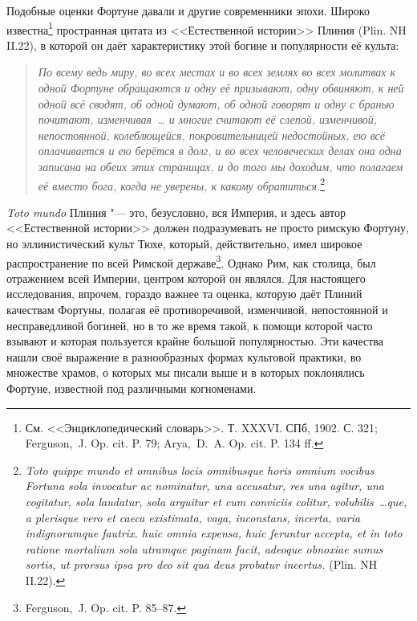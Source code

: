 Подобные оценки Фортуне давали и другие современники эпохи. Широко известна\footnote{См. <<Энциклопедический словарь>>. Т. XXXVI. СПб, 1902. С. 321; Ferguson,~J. Op. cit. P. 79; Arya,~D.~A. Op. cit. P. 134 ff.} пространная цитата из <<Естественной истории>> Плиния (Plin. NH II.22), в которой он даёт характеристику этой богине и популярности её культа:

\begin{quote}
\textit{По всему ведь миру, во всех местах и во всех землях во всех молитвах к одной Фортуне обращаются и одну её призывают, одну обвиняют, к ней одной всё сводят, об одной думают, об одной говорят и одну с бранью почитают, изменчивая~\ldots{} и многие считают её слепой, изменчивой, непостоянной, колеблющейся, покровительницей недостойных, ею всё оплачивается и ею берётся в долг, и во всех человеческих делах она одна записана на обеих этих страницах, и до того мы доходим, что полагаем её вместо бога, когда не уверены, к какому обратиться.}\footnote{\textit{Toto quippe mundo et omnibus locis omnibusque horis omnium vocibus Fortuna sola invocatur ac nominatur, una accusatur, res una agitur, una cogitatur, sola laudatur, sola arguitur et cum conviciis colitur, volubilis~\ldots que, a plerisque vero et caeca existimata, vaga, inconstans, incerta, varia indignorumque fautrix. huic omnia expensa, huic feruntur accepta, et in toto ratione mortalium sola utramque paginam facit, adeoque obnoxiae sumus sortis, ut prorsus ipsa pro deo sit qua deus probatur incertus.} (Plin. NH II.22).}
\end{quote}

\textit{Toto mundo} Плиния "--- это, безусловно, вся Империя, и здесь автор <<Естественной истории>> должен подразумевать не просто римскую Фортуну, но эллинистический культ Тюхе, который, действительно, имел широкое распространение по всей Римской державе\footnote{Ferguson,~J. Op. cit. P. 85--87.}. Однако Рим, как столица, был отражением всей Империи, центром которой он являлся. Для настоящего исследования, впрочем, гораздо важнее та оценка, которую даёт Плиний качествам Фортуны, полагая её противоречивой, изменчивой, непостоянной и несправедливой богиней, но в то же время такой, к помощи которой часто взывают и которая пользуется крайне большой популярностью. Эти качества нашли своё выражение в разнообразных формах культовой практики, во множестве храмов, о которых мы писали выше и в которых поклонялись Фортуне, известной под различными когноменами. %

